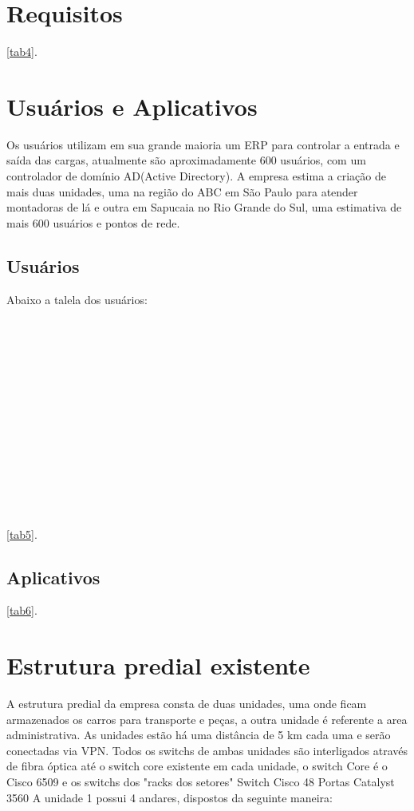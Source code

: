 \documentclass[	DIV=calc,%
							paper=a4,%
							fontsize=12pt,%
							onecolumn]{scrartcl}	 					%
\begin{document}
\section{Requisitos}
\ref{tab4}.


\section{Usuários e Aplicativos}

Os usuários utilizam em sua grande maioria um ERP para controlar a entrada e saída das cargas, atualmente são aproximadamente 600 usuários, com um controlador de domínio AD(Active Directory). A empresa estima a criação de mais duas unidades, uma na região do ABC em São Paulo para atender montadoras de lá e outra em Sapucaia no Rio Grande do Sul, uma estimativa de mais 600 usuários e pontos de rede.

\subsection{Usuários}
Abaixo a talela dos usuários:
 \\
\\
\\
\\
\\
 \\
\\
\\
\\
\\ 
\\
\\
\\
\\
\\
 \ref{tab5}.


\subsection{Aplicativos}
 \ref{tab6}.

\section{Estrutura predial existente}

A estrutura predial da empresa consta de duas unidades, uma onde ficam armazenados os carros para transporte e peças, a outra unidade é referente a area administrativa. As unidades estão há uma distância de 5 km cada uma e serão conectadas via VPN.
Todos os switchs de ambas unidades são interligados através de fibra óptica até o switch core existente em cada unidade, o switch Core é o Cisco 6509 e os switchs dos "racks dos setores" Switch Cisco 48 Portas Catalyst 3560
A unidade 1 possui 4 andares, dispostos da seguinte maneira:
\end{document}
